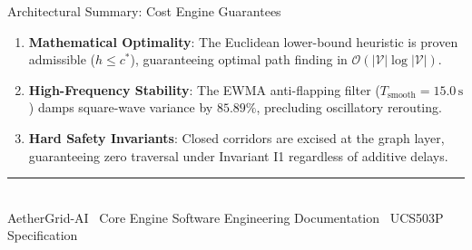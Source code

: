 \documentclass[10pt,a4paper]{article}
\begin{document}
\begin{specbox}{Architectural Summary: Cost Engine Guarantees}
\begin{enumerate}\setlength{\itemsep}{1.5pt}\setlength{\topsep}{1pt}
  \item \textbf{Mathematical Optimality}: The Euclidean lower-bound heuristic is proven admissible ($h \le c^*$), guaranteeing optimal path finding in $\mathcal{O}(|\mathcal{V}|\log|\mathcal{V}|)$.
  \item \textbf{High-Frequency Stability}: The EWMA anti-flapping filter ($T_{\text{smooth}} = 15.0\,\text{s}$) damps square-wave variance by $85.89\%$, precluding oscillatory rerouting.
  \item \textbf{Hard Safety Invariants}: Closed corridors are excised at the graph layer, guaranteeing zero traversal under Invariant I1 regardless of additive delays.
\end{enumerate}
\end{specbox}

\vspace{2pt}
\begin{center}
  {\color{brandborder}\rule{0.6\textwidth}{0.8pt}} \\[2pt]
  {\sffamily\tiny\color{codecomm}AetherGrid-AI \textbar\ Core Engine Software Engineering Documentation \textbar\ UCS503P Specification}
\end{center}
\end{document}
